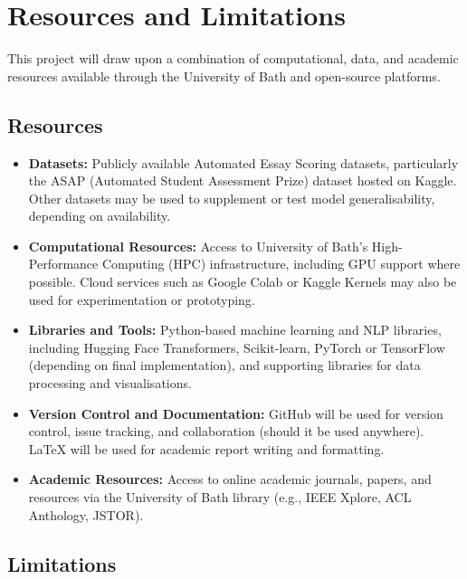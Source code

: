 \documentclass[11pt]{article}
\begin{document}
\section*{Resources and Limitations}

This project will draw upon a combination of computational, data, and academic resources available through the University of Bath and open-source platforms.

\subsection*{Resources}

\begin{itemize}
    \item \textbf{Datasets:} Publicly available Automated Essay Scoring datasets, particularly the ASAP (Automated Student Assessment Prize) dataset hosted on Kaggle. Other datasets may be used to 
    supplement or test model generalisability, depending on availability.
    
    \item \textbf{Computational Resources:} Access to University of Bath’s High-Performance Computing (HPC) infrastructure, including GPU support where possible. Cloud services such as Google Colab 
    or Kaggle Kernels may also be used for experimentation or prototyping.
    
    \item \textbf{Libraries and Tools:} Python-based machine learning and NLP libraries, including Hugging Face Transformers, Scikit-learn, PyTorch or TensorFlow (depending on final implementation), 
    and supporting libraries for data processing and visualisations.
    
    \item \textbf{Version Control and Documentation:} GitHub will be used for version control, issue tracking, and collaboration (should it be used anywhere). LaTeX will be used for academic report writing and 
    formatting.
    
    \item \textbf{Academic Resources:} Access to online academic journals, papers, and resources via the University of Bath library (e.g., IEEE Xplore, ACL Anthology, JSTOR).
\end{itemize}

\subsection*{Limitations}
\end{document}
